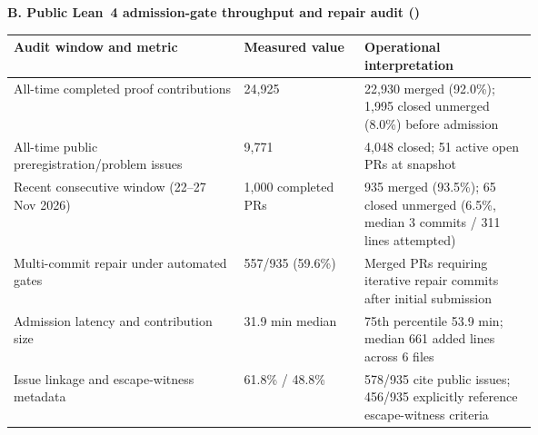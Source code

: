 \begin{table}[htbp]
\textbf{B. Public Lean~4 admission-gate throughput and repair audit ()}\par\smallskip
\begin{tabularx}{\linewidth}{@{}L{0.44\linewidth}L{0.23\linewidth}Y@{}}
\toprule Audit window and metric & Measured value & Operational interpretation \\ \midrule
All-time completed proof contributions & 24,925 & 22,930 merged (92.0\%); 1,995 closed unmerged (8.0\%) before admission \\
All-time public preregistration/problem issues & 9,771 & 4,048 closed; 51 active open PRs at snapshot \\
Recent consecutive window (22--27 Nov 2026) & 1,000 completed PRs & 935 merged (93.5\%); 65 closed unmerged (6.5\%, median 3 commits / 311 lines attempted) \\
Multi-commit repair under automated gates & 557/935 (59.6\%) & Merged PRs requiring iterative repair commits after initial submission \\
Admission latency and contribution size & 31.9 min median & 75th percentile 53.9 min; median 661 added lines across 6 files \\
Issue linkage and escape-witness metadata & 61.8\% / 48.8\% & 578/935 cite public issues; 456/935 explicitly reference escape-witness criteria \\
\bottomrule\end{tabularx}
\end{table}
